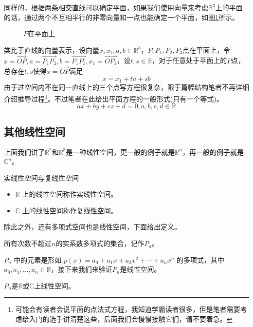 同样的，根据两条相交直线可以确定平面，如果我们使用向量来考虑$\mathbb{R}^3$上的平面的话，通过两个不互相平行的非零向量和一点也能确定一个平面，如图\ref{tikz:space.face}所示。

\begin{figure}[htbp]
	\centering
	
	\caption{$P$在平面上}
	\label{tikz:space.face}
\end{figure}

类比于直线的向量表示，设向量$x,x_1,a,b\in \mathbb{R}^3$，$P,P_1,P_2,P_3$点在平面上，令$x=\overrightarrow{OP},a=\overrightarrow{P_1P_2},b=\overrightarrow{P_1P_3},x_1=\overrightarrow{OP_1}$，设$t,s\in \mathbb{R}$，对于任意处于平面上的$P$点，总存在$t,s$使得$x=\overrightarrow{OP}$满足$$x=x_1+ta+sb$$由于过空间内不在同一直线上的三个点写方程很复杂，限于篇幅结构笔者不再详细介绍推导过程\footnote{可能会有读者会说平面的点法式方程，我知道学霸读者很多，但是笔者需要考虑给入门的选手讲清楚这些，后面我们会慢慢接触它们，请不要着急。}。不过笔者在此给出平面方程的一般形式(只有一个等式)。$$ax+by+cz+d=0,a,b,c,d\in \mathbb{R}$$

\subsection{其他线性空间}

上面我们讲了$\mathbb{R}^2$和$\mathbb{R}^3$是一种线性空间，更一般的例子就是$\mathbb{R}^n$，再一般的例子就是$\mathbb{C}^n$。

\begin{definition}{实线性空间与复线性空间}
	\begin{itemize}
		\item $\mathbb{R}$ 上的线性空间称作实线性空间。
		\item $\mathbb{C}$ 上的线性空间称作复线性空间。
	\end{itemize}
\end{definition}

除此之外，还有多项式空间也是线性空间，下面给出定义。

\begin{definition}
	所有次数不超过$n$的实系数多项式的集合，记作$P_n$。
\end{definition}

$P_n$ 中的元素是形如 $p(x) = a_0 + a_1 x + a_2 x^2 + \cdots + a_n x^n$ 的多项式，其中 $a_0, a_1, \dots, a_n \in \mathbb{R}$，接下来我们来验证$P_n$是线性空间。

\begin{corollary}
	$P_n$是$\mathbb{R}$或$\mathbb{C}$上线性空间。
\end{corollary}

